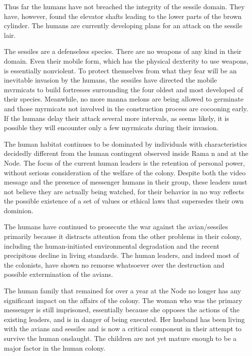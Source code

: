 \documentclass[]{article}
\begin{document}
{{Thus far the humans have not breached the integrity of the sessile domain. They have, however, found the elevator shafts leading to the lower parts of the brown cylinder. The humans are currently developing plans for an attack on the sessile lair.

The sessiles are a defenseless species. There are no weapons of any kind in their domain. Even their mobile form, which has the physical dexterity to use weapons, is essentially nonviolent. To protect themselves from what they fear will be an inevitable invasion by the humans, the sessiles have directed the mobile mvrmicats to build fortresses surrounding the four oldest and most developed of their species. Meanwhile, no more manna melons are being allowed to germinate and those myrmicats not involved in the construction process are cocooning early. If the humans delay their attack several more intervals, as seems likely, it is possible they will encounter only a few myrmicats during their invasion.

The human habitat continues to be dominated by individuals with characteristics decidedly different from the human contingent observed inside Rama n and at the Node. The focus of the current human leaders is the retention of personal power, without serious consideration of the welfare of the colony. Despite both the video message and the presence of messenger humans in their group, these leaders must not believe they are actually being watched, for their behavior in no way reflects the possible existence of a set of values or ethical laws that supersedes their own dominion.

The humans have continued to prosecute the war against the avian/sessiles primarily because it distracts attention from the other problems in their colony, including the human-initiated environmental degradation and the recent precipitous decline in living standards. The human leaders, and indeed most of the colonists, have shown no remorse whatsoever over the destruction and possible extermination of the avians.

The human family that remained for over a year at the Node no longer has any significant impact on the affairs of the colony. The woman who was the primary messenger is still imprisoned, essentially because she opposes the actions of the existing leaders, and is in danger of being executed. Her husband has been living with the avians and sessiles and is now a critical component in their attempt to survive the human onslaught. The children are not yet mature enough to be a major factor in the human colony.

}}
\end{document}
